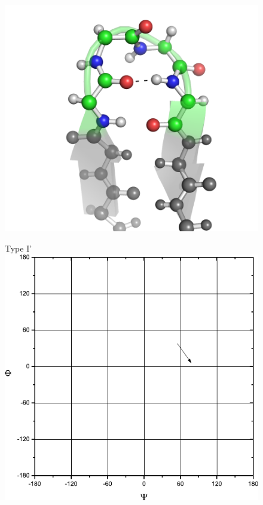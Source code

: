\begin{figure}[p]

\begin{minipage}[b]{0.5\linewidth}
\centering
\includegraphics[width=1.0\textwidth]{./01-ProteinStructure/turns/beta-type-Ip.png}
\end{minipage}
\hspace{0.5cm}
\begin{minipage}[b]{0.3\linewidth}
\centering
Type I'
\includegraphics[width=1.0\textwidth]{./01-ProteinStructure/turns/beta-ram-type-Ip.pdf}
\end{minipage}


\end{figure}

